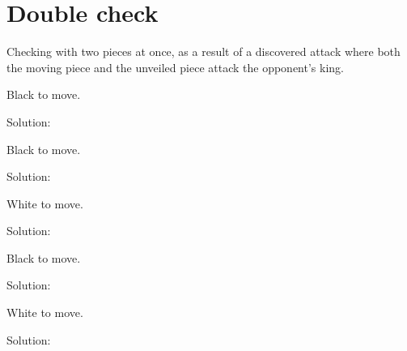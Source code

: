 \documentclass{book}
\begin{document}
\section{Double check}
Checking with two pieces at once, as a result of a discovered attack where both the moving piece and the unveiled piece attack the opponent's king.\begin{multicols}{2} 
\begin{samepage} 
\newgame 


 
\showboard
 
 Black to move. 
 
Solution: 
 
\end{samepage}\begin{samepage} 
\newgame 


 
\showboard
 
 Black to move. 
 
Solution: 
 
\end{samepage}\begin{samepage} 
\newgame 


 
\showboard
 
 White to move. 
 
Solution: 
 
\end{samepage}\begin{samepage} 
\newgame 


 
\showboard
 
 Black to move. 
 
Solution: 
 
\end{samepage}\begin{samepage} 
\newgame 


 
\showboard
 
 White to move. 
 
Solution: 
 

\end{samepage}
\end{multicols}
\end{document}
